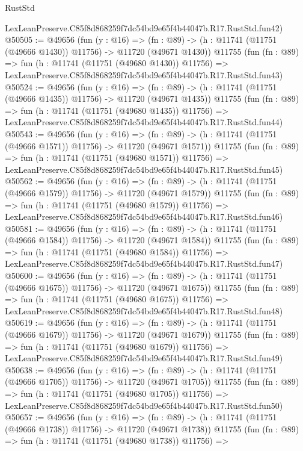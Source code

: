 \begin{lexlean}{RustStd}
\begin{coremodule}
    LexLeanPreserve.C85f8d868259f7dc54bd9e65f4b44047b.R17.RustStd.fun42)
@50505 := @49656
    (fun (y : @16) =>
    (fn : @89) -> (h : @11741 (@11751 (@49666 @1430)) @11756) -> @11720 (@49671 @1430))
    @11755
    (fun (fn : @89) =>
    fun (h : @11741 (@11751 (@49680 @1430)) @11756) =>
    LexLeanPreserve.C85f8d868259f7dc54bd9e65f4b44047b.R17.RustStd.fun43)
@50524 := @49656
    (fun (y : @16) =>
    (fn : @89) -> (h : @11741 (@11751 (@49666 @1435)) @11756) -> @11720 (@49671 @1435))
    @11755
    (fun (fn : @89) =>
    fun (h : @11741 (@11751 (@49680 @1435)) @11756) =>
    LexLeanPreserve.C85f8d868259f7dc54bd9e65f4b44047b.R17.RustStd.fun44)
@50543 := @49656
    (fun (y : @16) =>
    (fn : @89) -> (h : @11741 (@11751 (@49666 @1571)) @11756) -> @11720 (@49671 @1571))
    @11755
    (fun (fn : @89) =>
    fun (h : @11741 (@11751 (@49680 @1571)) @11756) =>
    LexLeanPreserve.C85f8d868259f7dc54bd9e65f4b44047b.R17.RustStd.fun45)
@50562 := @49656
    (fun (y : @16) =>
    (fn : @89) -> (h : @11741 (@11751 (@49666 @1579)) @11756) -> @11720 (@49671 @1579))
    @11755
    (fun (fn : @89) =>
    fun (h : @11741 (@11751 (@49680 @1579)) @11756) =>
    LexLeanPreserve.C85f8d868259f7dc54bd9e65f4b44047b.R17.RustStd.fun46)
@50581 := @49656
    (fun (y : @16) =>
    (fn : @89) -> (h : @11741 (@11751 (@49666 @1584)) @11756) -> @11720 (@49671 @1584))
    @11755
    (fun (fn : @89) =>
    fun (h : @11741 (@11751 (@49680 @1584)) @11756) =>
    LexLeanPreserve.C85f8d868259f7dc54bd9e65f4b44047b.R17.RustStd.fun47)
@50600 := @49656
    (fun (y : @16) =>
    (fn : @89) -> (h : @11741 (@11751 (@49666 @1675)) @11756) -> @11720 (@49671 @1675))
    @11755
    (fun (fn : @89) =>
    fun (h : @11741 (@11751 (@49680 @1675)) @11756) =>
    LexLeanPreserve.C85f8d868259f7dc54bd9e65f4b44047b.R17.RustStd.fun48)
@50619 := @49656
    (fun (y : @16) =>
    (fn : @89) -> (h : @11741 (@11751 (@49666 @1679)) @11756) -> @11720 (@49671 @1679))
    @11755
    (fun (fn : @89) =>
    fun (h : @11741 (@11751 (@49680 @1679)) @11756) =>
    LexLeanPreserve.C85f8d868259f7dc54bd9e65f4b44047b.R17.RustStd.fun49)
@50638 := @49656
    (fun (y : @16) =>
    (fn : @89) -> (h : @11741 (@11751 (@49666 @1705)) @11756) -> @11720 (@49671 @1705))
    @11755
    (fun (fn : @89) =>
    fun (h : @11741 (@11751 (@49680 @1705)) @11756) =>
    LexLeanPreserve.C85f8d868259f7dc54bd9e65f4b44047b.R17.RustStd.fun50)
@50657 := @49656
    (fun (y : @16) =>
    (fn : @89) -> (h : @11741 (@11751 (@49666 @1738)) @11756) -> @11720 (@49671 @1738))
    @11755
    (fun (fn : @89) =>
    fun (h : @11741 (@11751 (@49680 @1738)) @11756) =>

\end{coremodule}
\end{lexlean}
